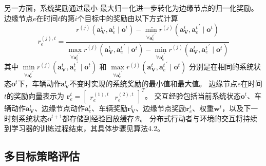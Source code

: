另一方面，系统奖励通过最小-最大归一化进一步转化为边缘节点的归一化奖励。
边缘节点$e$在时间$t$的第$i$个目标中的奖励由以下方式计算 
\begin{equation}
	r_{e}^{(j), t}= \frac{r^{(j)}\left(\boldsymbol{a}_{\mathbf{V}}^{t},\boldsymbol{a}_{e}^{t} \mid \boldsymbol{o}^{t}\right) - \min \limits_{\forall {\boldsymbol{a}_{e}^{t}}^{\prime}} r^{(j)}\left(\boldsymbol{a}_{\mathbf{V}}^{t}, {\boldsymbol{a}_{e}^{t}}^{\prime} \mid \boldsymbol{o}^{t}\right)} {\max \limits_{\forall {\boldsymbol{a}_{e}^{t}}^{\prime}} r^{(j)}\left(\boldsymbol{a}_{\mathbf{V}}^{t}, {\boldsymbol{a}_{e}^{t}}^{\prime} \mid \boldsymbol{o}^{t}\right) - \min \limits_{\forall {\boldsymbol{a}_{e}^{t}}^{\prime}} r^{(j)}\left(\boldsymbol{a}_{\mathbf{V}}^{t}, {\boldsymbol{a}_{e}^{t}}^{\prime} \mid \boldsymbol{o}^{t}\right)}
\label{equ 4-41}
\end{equation}
\noindent 其中 $\min \limits_{\forall {\boldsymbol{a}_{e}^{t}}^{\prime}} r^{(j)} (\boldsymbol{a}_{\mathbf{V}}^{t}, {\boldsymbol{a}_{e}^{t}}^{\prime} \mid \boldsymbol{o}^{t})$ 和 $\max \limits_{\forall {\boldsymbol{a}_{e}^{t}}^{\prime}} r^{(j)}(\boldsymbol{a}_{\mathbf{V}}^{t}, {\boldsymbol{a}_{e}^{t}}^{\prime} \mid \boldsymbol{o}^{t})$ 分别是在相同的系统状态$\boldsymbol{o}^{t}$下，车辆动作$\boldsymbol{a}_{\mathbf{V}}^{t}$不变时实现的系统奖励的最小值和最大值。
边缘节点$e$在时间$t$的奖励向量表示为 $\boldsymbol{r}_{e}^{t} = \begin{bmatrix}  r_{e}^{(1), t}  &  r_{e}^{(2), t} \end{bmatrix} ^{T}$。
交互经验包括当前系统状态$\boldsymbol{o}^{t}$、车辆动作$\boldsymbol{a}_{\mathbf{V}}^{t}$、边缘节点动作$\boldsymbol{a}_{e}^{t}$、车辆奖励$\boldsymbol{r}_{\mathbf{V}}^{t}$、边缘节点奖励$\boldsymbol{r}_{e}^{t}$、权重$\boldsymbol{w}^{t}$，以及下一时刻系统状态$\boldsymbol{o}^{t+1}$都存储到经验回放缓存$\mathcal{B}$。
分布式行动者与环境的交互将持续到学习器的训练过程结束，其具体步骤见算法4.2。

\subsection{多目标策略评估}

